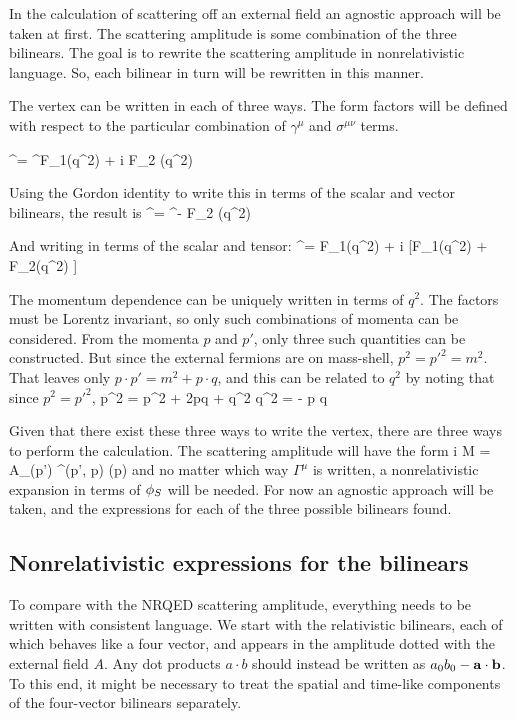 In the calculation of scattering off an external field an agnostic approach will be taken at first.  The scattering amplitude is some combination of the three bilinears.  The goal is to rewrite the scattering amplitude in nonrelativistic language.  So, each bilinear in turn will be rewritten in this manner.

The vertex can be written in each of three ways.  The form factors will be defined with respect to the particular combination of $\gamma^\mu$ and $\sigma^{\mu\nu}$ terms.

\beq
	\Gamma^\mu = \gamma^\mu F_1(q^2) + i  F_2 (q^2)
\eeq

Using the Gordon identity to write this in terms of the scalar and vector bilinears, the result is
\beq
	\Gamma^\mu = \gamma^\mu [F_1(q^2) + F_2(q^2) ]  -  F_2 (q^2)
\eeq

And writing in terms of the scalar and tensor:
\beq
	\Gamma^\mu =  F_1(q^2) + i  [F_1(q^2) + F_2(q^2) ] 
\eeq

The momentum dependence can be uniquely written in terms of $q^2$.  The factors must be Lorentz invariant, so only such combinations of momenta can be considered.  From the momenta $p$ and $p'$, only three such quantities can be constructed.  But since the external fermions are on mass-shell, $p^2 = p'^2 = m^2$.  That leaves only $p \cdot p' = m^2 + p \cdot q$, and this can be related to $q^2$ by noting that since $p^2 = p'^2$,
\beq
	p^2 = p^2 + 2p\cdot q + q^2  \to q^2 = - p \cdot q
\eeq


Given that there exist these three ways to write the vertex, there are three ways to perform the calculation.  The scattering amplitude will have the form
\beq	
	i M = 	A_\mu \srb(p') \Gamma^\mu(p', p) \sr(p) 
\eeq
and no matter which way $\Gamma^\mu$ is written, a nonrelativistic expansion in terms of $\phi_S$ will be needed.  For now an agnostic approach will be taken, and the expressions for each of the three possible bilinears found.


\subsection{Nonrelativistic expressions for the bilinears}
To compare with the NRQED scattering amplitude, everything needs to be written with consistent language.  We start with the relativistic bilinears, each of which behaves like a four vector, and appears in the amplitude dotted with the external field $A$.  Any dot products $a \cdot b$ should instead be written as $a_0 b_0 - \mathbf{a} \cdot \mathbf{b}$.  To this end, it might be necessary to treat the spatial and time-like components of the four-vector bilinears separately.

